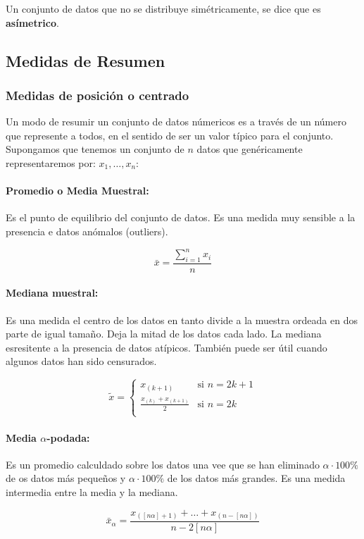 Un conjunto de datos que no se distribuye simétricamente, se dice que es \textbf{asímetrico}.

\subsection{Medidas de Resumen}
\subsubsection{Medidas de posición o centrado}
Un modo de resumir un conjunto de datos númericos es a través de un número que represente a todos, en el sentido de ser un valor típico para el conjunto.
Supongamos que tenemos un conjunto de $n$ datos que genéricamente representaremos por: $x_1,\dots,x_n$:

\paragraph{Promedio o Media Muestral:} Es el punto de equilibrio del conjunto de datos. Es una medida muy sensible a la presencia e datos anómalos  (outliers).

$$\bar{x} = \frac{\sum\limits_{i=1}^{n}x_i}{n}$$

\paragraph{Mediana muestral:} Es una medida el centro de los datos en tanto divide a la muestra ordeada en dos parte de igual tamaño. Deja la mitad de los datos cada lado.  La mediana esresitente a la presencia de datos atípicos. También puede ser útil cuando algunos datos han sido censurados.

$$\tilde{x} =\left\{ \begin{array}{ll}
x_{(k+1)} & \text{si } n = 2k + 1 \\
\frac{x_{(k)} + x_{(k+1)}}{2} & \text{si } n=2k \\
\end{array}\right.$$

\paragraph{Media $\alpha$-podada:} Es un promedio calculdado sobre los datos una vee que se han eliminado $\alpha\cdot 100\%$ de os datos más pequeños y $\alpha\cdot 100\%$ de los datos más grandes. Es una medida intermedia entre la media y la mediana.

$$\bar{x}_{\alpha} = \frac{x_{([n\alpha] + 1)} + \dots + x_{(n-[n\alpha])}}{n-2[n\alpha]}$$

